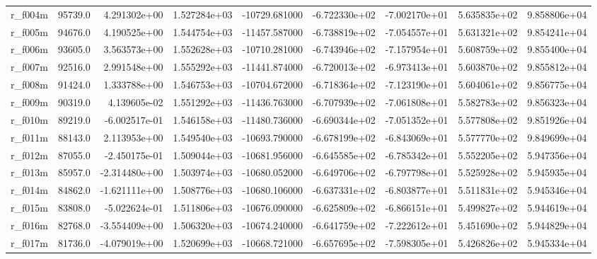 \documentclass[10pt]{article}
\begin{document}
\begin{landscape}
\begin{longtable}{lrrrrrrrr}
r\_f004m                 &   95739.0 &  4.291302e+00 &  1.527284e+03 & -10729.681000 & -6.722330e+02 & -7.002170e+01 &  5.635835e+02 &  9.858806e+04 \\
r\_f005m                 &   94676.0 &  4.190525e+00 &  1.544754e+03 & -11457.587000 & -6.738819e+02 & -7.054557e+01 &  5.631321e+02 &  9.854241e+04 \\
r\_f006m                 &   93605.0 &  3.563573e+00 &  1.552628e+03 & -10710.281000 & -6.743946e+02 & -7.157954e+01 &  5.608759e+02 &  9.855400e+04 \\
r\_f007m                 &   92516.0 &  2.991548e+00 &  1.555292e+03 & -11441.874000 & -6.720013e+02 & -6.973413e+01 &  5.603870e+02 &  9.855812e+04 \\
r\_f008m                 &   91424.0 &  1.333788e+00 &  1.546753e+03 & -10704.672000 & -6.718364e+02 & -7.123190e+01 &  5.604061e+02 &  9.856775e+04 \\
r\_f009m                 &   90319.0 &  4.139605e-02 &  1.551292e+03 & -11436.763000 & -6.707939e+02 & -7.061808e+01 &  5.582783e+02 &  9.856323e+04 \\
r\_f010m                 &   89219.0 & -6.002517e-01 &  1.546158e+03 & -11480.736000 & -6.690344e+02 & -7.051352e+01 &  5.577808e+02 &  9.851926e+04 \\
r\_f011m                 &   88143.0 &  2.113953e+00 &  1.549540e+03 & -10693.790000 & -6.678199e+02 & -6.843069e+01 &  5.577770e+02 &  9.849699e+04 \\
r\_f012m                 &   87055.0 & -2.450175e-01 &  1.509044e+03 & -10681.956000 & -6.645585e+02 & -6.785342e+01 &  5.552205e+02 &  5.947356e+04 \\
r\_f013m                 &   85957.0 & -2.314480e+00 &  1.503974e+03 & -10680.052000 & -6.649706e+02 & -6.797798e+01 &  5.525928e+02 &  5.945935e+04 \\
r\_f014m                 &   84862.0 & -1.621111e+00 &  1.508776e+03 & -10680.106000 & -6.637331e+02 & -6.803877e+01 &  5.511831e+02 &  5.945346e+04 \\
r\_f015m                 &   83808.0 & -5.022624e-01 &  1.511806e+03 & -10676.090000 & -6.625809e+02 & -6.866151e+01 &  5.499827e+02 &  5.944619e+04 \\
r\_f016m                 &   82768.0 & -3.554409e+00 &  1.506320e+03 & -10674.240000 & -6.641759e+02 & -7.222612e+01 &  5.451690e+02 &  5.944829e+04 \\
r\_f017m                 &   81736.0 & -4.079019e+00 &  1.520699e+03 & -10668.721000 & -6.657695e+02 & -7.598305e+01 &  5.426826e+02 &  5.945334e+04 \\

\end{longtable}
\end{landscape}
\end{document}
